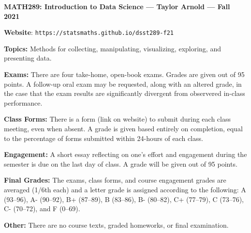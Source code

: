 \documentclass[11pt, a4paper]{article}
\begin{document}
\begin{center}
\textbf{MATH289: Introduction to Data Science --- Taylor Arnold --- Fall 2021}
\end{center}

\vspace{0.5cm}

\textbf{Website}: \texttt{https://statsmaths.github.io/dsst289-f21}

\bigskip

\textbf{Topics:}
Methods for collecting, manipulating, visualizing, exploring, and presenting
data.

\bigskip

\textbf{Exams:}
There are four take-home, open-book exams. Grades are given out of 95 points.
A follow-up oral exam may be requested, along with an altered grade, in the case
that the exam results are significantly divergent from observered in-class
performance.

\bigskip

\textbf{Class Forms:}
There is a form (link on website) to submit during each class meeting, even
when absent. A grade is given based entirely on completion, equal to the
percentage of forms submitted within 24-hours of each class.

\bigskip

\textbf{Engagement:}
A short essay reflecting on one's effort and engagement during the semester
is due on the last day of class. A grade will be given out of 95 points.

\bigskip

\textbf{Final Grades:}
The exams, class forms, and course engagement grades are averaged (1/6th each)
and a letter grade is assigned according to the following:
             A (93--96), A- (90--92),
B+ (87--89), B (83--86), B- (80--82),
C+ (77--79), C (73--76), C- (70--72), and F (0--69).

\bigskip

\textbf{Other:}
There are no course texts, graded homeworks, or final examination.

\vspace{0.25cm}

\begin{center}
\end{center}
\end{document}
